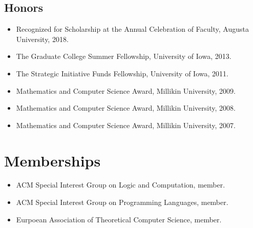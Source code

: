 \documentclass{article}
\begin{document}
  \subsection{Honors}
  \begin{itemize}
  \item[] Recognized for Scholarship at the Annual Celebration of Faculty, Augusta University, 2018.
  \item[] The Graduate College Summer Fellowship, University of Iowa, 2013.

  \item[] The Strategic Initiative Funds Fellowship, University of Iowa, 2011.
    
  \item[] Mathematics and Computer Science Award, Millikin University, 2009.  

  \item[] Mathematics and Computer Science Award, Millikin University, 2008.  

  \item[] Mathematics and Computer Science Award, Millikin University, 2007.
  \end{itemize}

  \section{Memberships}
  \label{sec:memberships}
  \begin{itemize}
  \item[] ACM Special Interest Group on Logic and Computation, member.
    
  \item[] ACM Special Interest Group on Programming Languages, member.
    
  \item[] Eurpoean Association of Theoretical Computer Science, member.
  \end{itemize}
\end{document}
